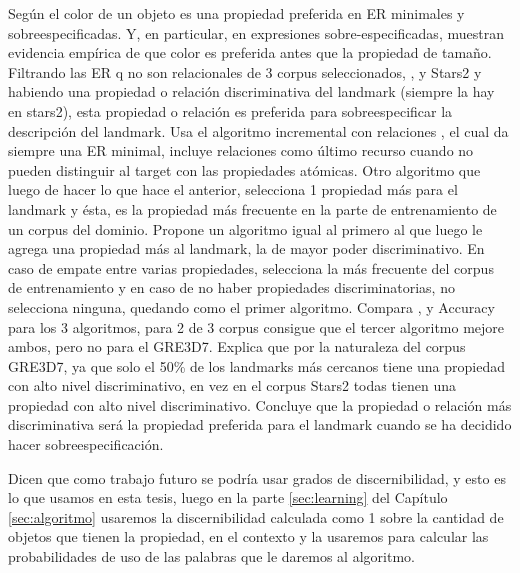Seg\'un \cite{pechmann} el color de un objeto es una propiedad preferida en ER minimales y sobreespecificadas. Y, en particular, en expresiones sobre-especificadas, \cite{time-course} muestran evidencia emp\'irica de que color es preferida antes que la propiedad de tama\~no.
Filtrando las ER q no son relacionales de 3 corpus seleccionados, \cite{gre3d3}, \cite{gre3d7} y Stars2 y habiendo una propiedad o relaci\'on discriminativa del landmark (siempre la hay en stars2), esta propiedad o relaci\'on es preferida para sobreespecificar la descripci\'on del landmark.
Usa el algoritmo incremental con relaciones \cite{incremental}, el cual da siempre una ER minimal, incluye relaciones como \'ultimo recurso cuando no pueden distinguir al target con las propiedades at\'omicas. Otro algoritmo que luego de hacer lo que hace el anterior, selecciona 1 propiedad m\'as para el landmark y \'esta, es la propiedad m\'as frecuente en la parte de entrenamiento de un corpus del dominio. Propone un algoritmo igual al primero al que luego le agrega una propiedad m\'as al landmark, la de mayor poder discriminativo. En caso de empate entre varias propiedades, selecciona la m\'as frecuente del corpus de entrenamiento y en caso de no haber propiedades discriminatorias, no selecciona ninguna, quedando como el primer algoritmo. Compara \cite{dice}, y Accuracy para los 3 algoritmos, para 2 de 3 corpus consigue que el tercer algoritmo mejore ambos, pero no para el GRE3D7. 
Explica que por la naturaleza del corpus GRE3D7, ya que solo el 50\% de los landmarks m\'as cercanos tiene una propiedad con alto nivel discriminativo, en vez en el corpus Stars2 todas tienen una propiedad con alto nivel discriminativo. Concluye que la propiedad o relaci\'on m\'as discriminativa ser\'a la propiedad preferida para el landmark cuando se ha decidido hacer sobreespecificaci\'on.

Dicen que como trabajo futuro se podr\'ia usar grados de discernibilidad, y esto es lo que usamos en esta tesis, luego en la parte \ref{sec:learning} del Cap\'itulo \ref{sec:algoritmo} usaremos la discernibilidad calculada como 1 sobre la cantidad de objetos que tienen la propiedad, en el contexto y la usaremos para calcular las probabilidades de uso de las palabras que le daremos al algoritmo.

%





